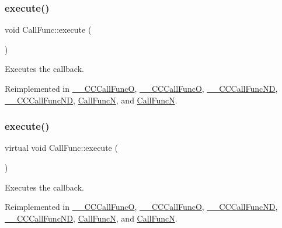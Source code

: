 \subsubsection{\texorpdfstring{execute()}{execute()}\hspace{0.1cm}{\footnotesize\ttfamily [1/2]}}
{\footnotesize\ttfamily void Call\+Func\+::execute (\begin{DoxyParamCaption}{ }\end{DoxyParamCaption})\hspace{0.3cm}{\ttfamily [virtual]}}

Executes the callback. 

Reimplemented in \hyperlink{class____CCCallFuncO_a89e4727ade4f68268afad8040fe08e81}{\+\_\+\+\_\+\+C\+C\+Call\+FuncO}, \hyperlink{class____CCCallFuncO_aab83cafa03038b765f3752c6f2f307b1}{\+\_\+\+\_\+\+C\+C\+Call\+FuncO}, \hyperlink{class____CCCallFuncND_a9e3c2cd81860d951e9a83ce29cc40f38}{\+\_\+\+\_\+\+C\+C\+Call\+Func\+ND}, \hyperlink{class____CCCallFuncND_a1f60a7eca795f5ab5e551c7512b9791a}{\+\_\+\+\_\+\+C\+C\+Call\+Func\+ND}, \hyperlink{classCallFuncN_a072d0dabb4a2d7d211d164fedd79c47a}{Call\+FuncN}, and \hyperlink{classCallFuncN_af75fea048afe561409f3d8b156eb1a12}{Call\+FuncN}.

\mbox{\label{classCallFunc_acecd67ec8b96193ce6c2d3dfcf1e5f6c}} 
\subsubsection{\texorpdfstring{execute()}{execute()}\hspace{0.1cm}{\footnotesize\ttfamily [2/2]}}
{\footnotesize\ttfamily virtual void Call\+Func\+::execute (\begin{DoxyParamCaption}{ }\end{DoxyParamCaption})\hspace{0.3cm}{\ttfamily [virtual]}}

Executes the callback. 

Reimplemented in \hyperlink{class____CCCallFuncO_a89e4727ade4f68268afad8040fe08e81}{\+\_\+\+\_\+\+C\+C\+Call\+FuncO}, \hyperlink{class____CCCallFuncO_aab83cafa03038b765f3752c6f2f307b1}{\+\_\+\+\_\+\+C\+C\+Call\+FuncO}, \hyperlink{class____CCCallFuncND_a9e3c2cd81860d951e9a83ce29cc40f38}{\+\_\+\+\_\+\+C\+C\+Call\+Func\+ND}, \hyperlink{class____CCCallFuncND_a1f60a7eca795f5ab5e551c7512b9791a}{\+\_\+\+\_\+\+C\+C\+Call\+Func\+ND}, \hyperlink{classCallFuncN_a072d0dabb4a2d7d211d164fedd79c47a}{Call\+FuncN}, and \hyperlink{classCallFuncN_af75fea048afe561409f3d8b156eb1a12}{Call\+FuncN}.

